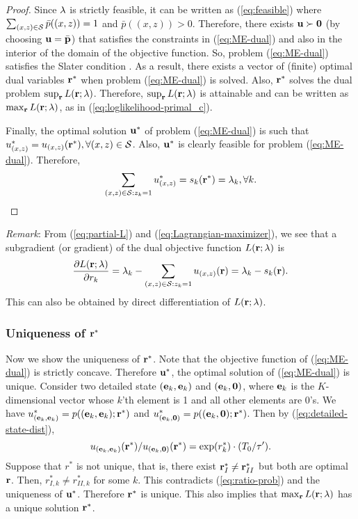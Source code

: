 \documentclass{IEEEtran}
\begin{document}
\begin{proof}
Since ${\bf \lambda}$ is strictly feasible, it can be written as
(\ref{eq:feasible}) where $\sum_{(x,z)\in{\cal S}}\bar{p}((x,z))=1$
and $\bar{p}((x,z))>0$. Therefore, there exists ${\bf u}\succ{\bf 0}$
(by choosing ${\bf u}=\bar{{\bf p}}$) that satisfies the constraints
in (\ref{eq:ME-dual}) and also in the interior of the domain of the
objective function. So, problem (\ref{eq:ME-dual}) satisfies the
Slater condition \cite{convex-book}. As a result, there exists a
vector of (finite) optimal dual variables ${\bf r}^{*}$ when problem
(\ref{eq:ME-dual}) is solved. Also, ${\bf r}^{*}$ solves the dual
problem $\sup_{{\bf r}}L({\bf r};{\bf \lambda})$. Therefore, $\sup_{{\bf r}}L({\bf r};{\bf \lambda})$
is attainable and can be written as $\max_{{\bf r}}L({\bf r};{\bf \lambda})$,
as in (\ref{eq:loglikelihood-primal_c}).

Finally, the optimal solution ${\bf u}^{*}$ of problem (\ref{eq:ME-dual})
is such that $u_{(x,z)}^{*}=u_{(x,z)}({\bf r}^{*}),\forall(x,z)\in{\cal S}$.
Also, ${\bf u}^{*}$ is clearly feasible for problem (\ref{eq:ME-dual}).
Therefore, \[
\sum_{(x,z)\in{\cal S}:z_{k}=1}u_{(x,z)}^{*}=s_{k}({\bf r}^{*})=\lambda_{k},\forall k.\]

\end{proof}
\emph{Remark}: From (\ref{eq:partial-L}) and (\ref{eq:Lagrangian-maximizer}),
we see that a subgradient (or gradient) of the dual objective function
$L({\bf r};{\bf \lambda})$ is \[
\frac{\partial L({\bf r};{\bf \lambda})}{\partial r_{k}}=\lambda_{k}-\sum_{(x,z)\in{\cal S}:z_{k}=1}u_{(x,z)}({\bf r})=\lambda_{k}-s_{k}({\bf r}).\]
This can also be obtained by direct differentiation of $L({\bf r};{\bf \lambda})$.


\subsubsection{\label{sub:uniqueness}Uniqueness of ${\bf r}^{*}$}

Now we show the uniqueness of ${\bf r}^{*}$. Note that the objective
function of (\ref{eq:ME-dual}) is strictly concave. Therefore ${\bf u}^{*}$,
the optimal solution of (\ref{eq:ME-dual}) is unique. Consider two
detailed state $({\bf e}_{k},{\bf e}_{k})$ and $({\bf e}_{k},{\bf 0})$,
where ${\bf e}_{k}$ is the $K$-dimensional vector whose $k$'th
element is 1 and all other elements are 0's. We have $u_{({\bf e}_{k},{\bf e}_{k})}^{*}=p(({\bf e}_{k},{\bf e}_{k});{\bf r}^{*})$
and $u_{({\bf e}_{k},{\bf 0})}^{*}=p(({\bf e}_{k},{\bf 0});{\bf r}^{*})$.
Then by (\ref{eq:detailed-state-dist}), \begin{equation}
u_{({\bf e}_{k},{\bf e}_{k})}({\bf r}^{*})/u_{({\bf e}_{k},{\bf 0})}({\bf r}^{*})=\exp(r_{k}^{*})\cdot(T_{0}/\tau').\label{eq:ratio-prob}\end{equation}
Suppose that $r^{*}$ is not unique, that is, there exist ${\bf r}_{I}^{*}\ne{\bf r}_{II}^{*}$
but both are optimal ${\bf r}$. Then, $r_{I,k}^{*}\ne r_{II,k}^{*}$
for some $k$. This contradicts (\ref{eq:ratio-prob}) and the uniqueness
of ${\bf u}^{*}$. Therefore ${\bf r}^{*}$ is unique. This also implies
that $\max_{{\bf r}}L({\bf r};{\bf \lambda})$ has a unique solution
${\bf r}^{*}$.
\end{document}
